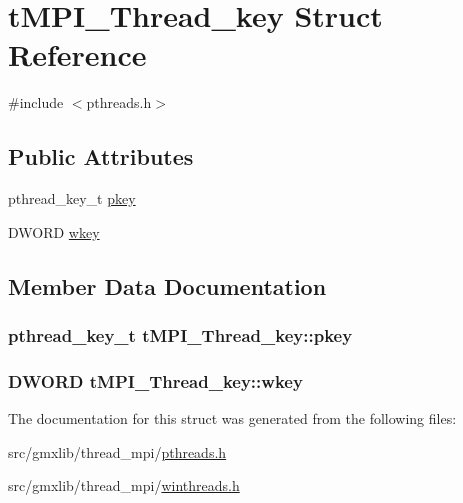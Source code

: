\hypertarget{structtMPI__Thread__key}{\section{t\-M\-P\-I\-\_\-\-Thread\-\_\-key \-Struct \-Reference}
\label{structtMPI__Thread__key}
}


{\ttfamily \#include $<$pthreads.\-h$>$}

\subsection*{\-Public \-Attributes}
\begin{DoxyCompactItemize}
\item 
pthread\-\_\-key\-\_\-t \hyperlink{structtMPI__Thread__key_ac8fa183b56effdbab30da5c273460fd7}{pkey}
\item 
\-D\-W\-O\-R\-D \hyperlink{structtMPI__Thread__key_aa050ac577347ee2cc4e92344bc208504}{wkey}
\end{DoxyCompactItemize}


\subsection{\-Member \-Data \-Documentation}
\hypertarget{structtMPI__Thread__key_ac8fa183b56effdbab30da5c273460fd7}{
\subsubsection[{pkey}]{\setlength{\rightskip}{0pt plus 5cm}pthread\-\_\-key\-\_\-t {\bf t\-M\-P\-I\-\_\-\-Thread\-\_\-key\-::pkey}}}\label{structtMPI__Thread__key_ac8fa183b56effdbab30da5c273460fd7}
\hypertarget{structtMPI__Thread__key_aa050ac577347ee2cc4e92344bc208504}{
\subsubsection[{wkey}]{\setlength{\rightskip}{0pt plus 5cm}\-D\-W\-O\-R\-D {\bf t\-M\-P\-I\-\_\-\-Thread\-\_\-key\-::wkey}}}\label{structtMPI__Thread__key_aa050ac577347ee2cc4e92344bc208504}


\-The documentation for this struct was generated from the following files\-:\begin{DoxyCompactItemize}
\item 
src/gmxlib/thread\-\_\-mpi/\hyperlink{pthreads_8h}{pthreads.\-h}\item 
src/gmxlib/thread\-\_\-mpi/\hyperlink{winthreads_8h}{winthreads.\-h}\end{DoxyCompactItemize}
